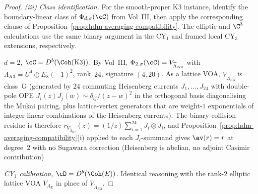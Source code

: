 \begin{proof}
\smallskip
\emph{\textup{(iii)} Class identification.} For the smooth-proper K3
instance, identify the boundary-linear class of
$\Phi_{d,\sigma}(\cC)$ from Vol~III, then apply the corresponding clause
of Proposition~\textup{\ref{prop:hdm-averaging-compatibility}}. The
elliptic and $\C^3$ calculations use the same binary argument in the
CY$_1$ and framed local CY$_3$ extensions, respectively.

\textit{$d=2$, $\cC = D^b(\Coh(\mathrm{K3}))$.}
By Vol~III, $\Phi_{2,\sigma}(\cC) = V_{\widetilde\Lambda_{K3}}$ with
$\widetilde\Lambda_{K3} = U^4 \oplus E_8(-1)^2$, rank~$24$,
signature $(4, 20)$. As a lattice VOA, $V_{\widetilde\Lambda_{K3}}$
is class~G \textup{(}generated by $24$ commuting Heisenberg
currents $J_1, \dots, J_{24}$ with double-pole OPE
$J_i(z) J_j(w) \sim \delta_{ij}/(z-w)^2$ in the orthogonal basis
diagonalising the Mukai pairing, plus lattice-vertex generators
that are weight-$1$ exponentials of integer linear combinations
of the Heisenberg currents\textup{).} The binary collision
residue is therefore
$r_{V_{\widetilde\Lambda_{K3}}}(z) = (1/z) \sum_{i=1}^{24}
J_i \otimes J_i$, and
Proposition~\textup{\ref{prop:hdm-averaging-compatibility}}\textup{(i)}
applied to each $J_i$-summand gives $\av(r) = r$ at degree~$2$
with no Sugawara correction \textup{(}Heisenberg is abelian, no
adjoint Casimir contribution\textup{).}

\textit{CY$_1$ calibration, $\cD = D^b(\Coh(E))$.} Identical reasoning with
the rank-$2$ elliptic lattice VOA $V_{\Lambda_E}$ in place of
$V_{\widetilde\Lambda_{K3}}$.


\end{proof}
